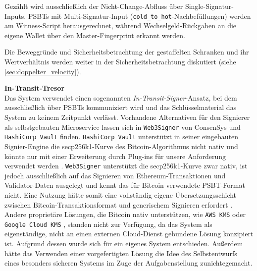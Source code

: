 Gezählt wird ausschließlich der Nicht-Change-Abfluss über Single-Signatur-Inputs.
\acp{PSBT} mit Multi-Signatur-Input (\texttt{cold\_to\_hot}-Nachbefüllungen) werden am Witness-Script herausgerechnet, während Wechselgeld-Rückgaben an die eigene Wallet über den Master-Fingerprint erkannt werden.

Die Beweggründe und Sicherheitsbetrachtung der gestaffelten Schranken und ihr Wertverhältnis werden weiter in der Sicherheitsbetrachtung diskutiert (siehe \ref{sec:doppelter_velocity}).

\textbf{In-Transit-Tresor} \label{sec:in_transit_vault} \\
Das System verwendet einen sogenannten \emph{In-Transit-Signer}-Ansatz, bei dem ausschließlich über \acp{PSBT} kommuniziert wird und das Schlüsselmaterial das System zu keinem Zeitpunkt verlässt.
Vorhandene Alternativen für den Signierer als selbstgebauten Microservice lassen sich in \texttt{Web3Signer} von ConsenSys und \texttt{HashiCorp Vault} finden. \texttt{HashiCorp Vault} unterstützt in seiner eingebauten Signier-Engine die secp256k1-Kurve des Bitcoin-Algorithmus nicht nativ und könnte nur mit einer Erweiterung durch Plug-ins für unsere Anforderung verwendet werden \cite{vault_plugin_ethsign, vault_issue3846, sec2}.
\texttt{Web3Signer} unterstützt die secp256k1-Kurve zwar nativ, ist jedoch ausschließlich auf das Signieren von Ethereum-Transaktionen und Validator-Daten ausgelegt und kennt das für Bitcoin verwendete \ac{PSBT}-Format nicht. Eine Nutzung hätte somit eine vollständig eigene Übersetzungsschicht zwischen Bitcoin-Transaktionsformat und generischem Signieren erfordert \cite{web3signer_docs}.
Andere proprietäre Lösungen, die Bitcoin nativ unterstützen, wie \texttt{AWS KMS} oder \texttt{Google Cloud KMS} \cite{gcp_kms_algorithms}, standen nicht zur Verfügung, da das System als eigenständige, nicht an einen externen Cloud-Dienst gebundene Lösung konzipiert ist. Aufgrund dessen wurde sich für ein eigenes System entschieden. Außerdem hätte das Verwenden einer vorgefertigten Lösung die Idee des Selbstentwurfs eines besonders sicheren Systems im Zuge der Aufgabenstellung zunichtegemacht.

